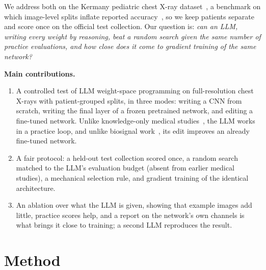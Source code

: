 \documentclass[runningheads]{llncs}
\begin{document}
We address both on the Kermany pediatric chest X-ray dataset~\cite{kermany2018}, a benchmark on which image-level splits inflate reported accuracy~\cite{singh2024}, so we keep patients separate and score once on the official test collection.
Our question is: \emph{can an LLM, writing every weight by reasoning, beat a random search given the same number of practice evaluations, and how close does it come to gradient training of the same network?}

\noindent\textbf{Main contributions.}
\begin{enumerate}
\item A controlled test of LLM weight-space programming on full-resolution chest X-rays with patient-grouped splits, in three modes: writing a CNN from scratch, writing the final layer of a frozen pretrained network, and editing a fine-tuned network. Unlike knowledge-only medical studies~\cite{lindholz2026}, the LLM works in a practice loop, and unlike biosignal work~\cite{varam2026}, its edit improves an already fine-tuned network.
\item A fair protocol: a held-out test collection scored once, a random search matched to the LLM's evaluation budget (absent from earlier medical studies), a mechanical selection rule, and gradient training of the identical architecture.
\item An ablation over what the LLM is given, showing that example images add little, practice scores help, and a report on the network's own channels is what brings it close to training; a second LLM reproduces the result.
\end{enumerate}

\section{Method}
\end{document}
